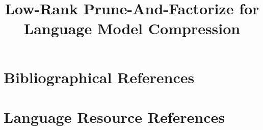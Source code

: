 \documentclass[10pt, a4paper]{article}
\title{Low-Rank Prune-And-Factorize for Language Model Compression}
\begin{document}
\maketitleabstract
	
	
	
	
\nocite{*}
\section{Bibliographical References}\label{sec:reference}




\section{Language Resource References}
\label{lr:ref}

\end{document}
